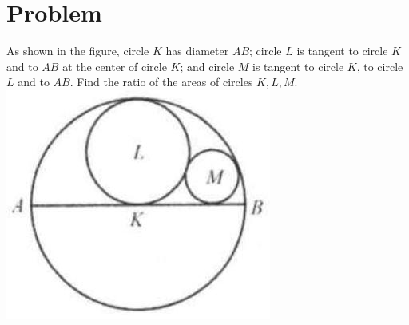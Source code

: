 \documentclass{article}
\begin{document}
\section*{Problem}
As shown in the figure, circle \(K\) has diameter \(A B\); circle \(L\) is tangent to circle \(K\) and to \(A B\) at the center of circle \(K\); and circle \(M\) is tangent to circle \(K\), to circle \(L\) and to \(A B\). Find the ratio of the areas of circles \(K, L, M\).\\
\centering
\includegraphics[width=\textwidth]{images/185(1).jpg}
\end{document}
